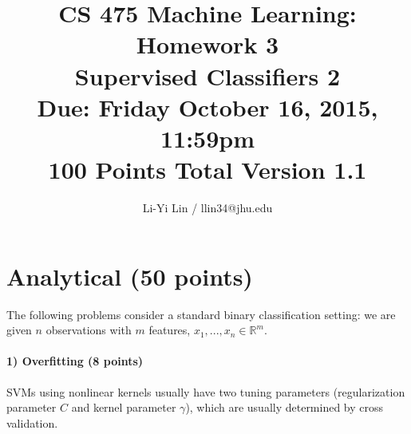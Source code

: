 \documentclass[11pt]{article}
\title{CS 475 Machine Learning: Homework 3\\Supervised Classifiers 2\\
\Large{Due: Friday October 16, 2015, 11:59pm}\\
100 Points Total \hspace{1cm} Version 1.1}
\author{Li-Yi Lin / llin34@jhu.edu}
\date{}
\begin{document}
\large
\maketitle
\thispagestyle{headings}




\section{Analytical (50 points)}

The following problems consider a standard binary classification setting: we are given $n$ observations with $m$ features, $x_1,...,x_n \in \mathbb{R}^m$.

\paragraph{1) Overfitting (8 points)}
SVMs using nonlinear kernels usually have two tuning parameters (regularization parameter $C$ and kernel parameter $\gamma$), which are usually determined by cross validation. 
\end{document}
